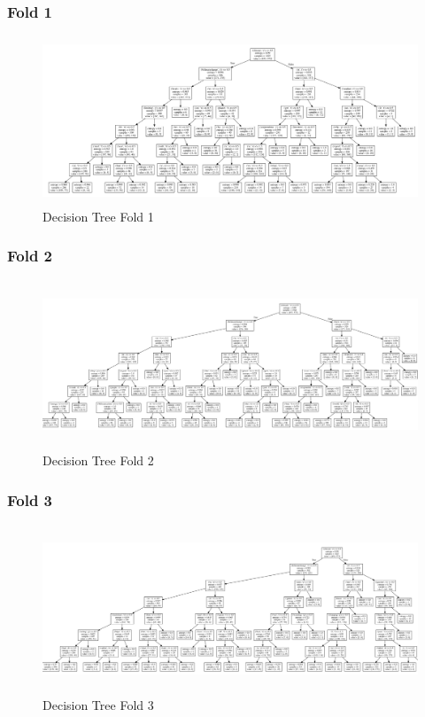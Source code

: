 \documentclass{article} %
\begin{document}
\subsubsection{Fold 1}

\begin{figure}[H]
	\includegraphics[height=5cm, width=17cm]{6.png}
	\caption{Decision Tree Fold 1}
\end{figure}

\subsubsection{Fold 2}

\begin{figure}[H]
	\includegraphics[height=5cm, width=17cm]{7.png}
	\caption{Decision Tree Fold 2}
\end{figure}

\subsubsection{Fold 3}

\begin{figure}[H]
	\includegraphics[height=5cm, width=17cm]{8.png}
	\caption{Decision Tree Fold 3}
\end{figure}
\end{document}
